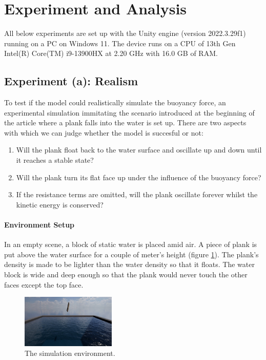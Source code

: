 \section{Experiment and Analysis}

All below experiments are set up with the Unity engine (version 2022.3.29f1) running on a PC on Windows 11.
The device runs on a CPU of 13th Gen Intel(R) Core(TM) i9-13900HX at 2.20 GHz with 16.0 GB of RAM.

\subsection{Experiment (a): Realism}

To test if the model could realistically simulate the buoyancy force, an experimental simulation immitating the scenario introduced at the beginning of the article where a plank falls into the water is set up.
There are two aspects with which we can judge whether the model is succesful or not:
\begin{enumerate}
	\item Will the plank float back to the water surface and oscillate up and down until it reaches a stable state?
	\item Will the plank turn its flat face up under the influence of the buoyancy force?
	\item If the resistance terms are omitted, will the plank oscillate forever whilst the kinetic energy is conserved?
\end{enumerate}

\paragraph*{Environment Setup}

In an empty scene, a block of static water is placed amid air.
A piece of plank is put above the water surface for a couple of meter's height (figure \ref{simulation-environment}).
The plank's density is made to be lighter than the water density so that it floats.
The water block is wide and deep enough so that the plank would never touch the other faces except the top face.

\begin{figure}[h]
	\centering
	\includegraphics[width=0.4\textwidth]{../Thesis/figures/experiment-environment.jpg}
	\caption{The simulation environment.}
	\label{simulation-environment}
\end{figure}

